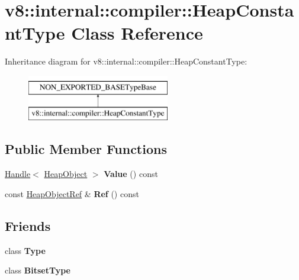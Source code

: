 \hypertarget{classv8_1_1internal_1_1compiler_1_1HeapConstantType}{}\section{v8\+:\+:internal\+:\+:compiler\+:\+:Heap\+Constant\+Type Class Reference}
\label{classv8_1_1internal_1_1compiler_1_1HeapConstantType}
Inheritance diagram for v8\+:\+:internal\+:\+:compiler\+:\+:Heap\+Constant\+Type\+:\begin{figure}[H]
\begin{center}
\leavevmode
\includegraphics[height=2.000000cm]{classv8_1_1internal_1_1compiler_1_1HeapConstantType}
\end{center}
\end{figure}
\subsection*{Public Member Functions}
\begin{DoxyCompactItemize}
\item 
\mbox{\label{classv8_1_1internal_1_1compiler_1_1HeapConstantType_ac09bcccb49115e5c814a49a6dc2c49ae}} 
\mbox{\hyperlink{classv8_1_1internal_1_1Handle}{Handle}}$<$ \mbox{\hyperlink{classv8_1_1internal_1_1HeapObject}{Heap\+Object}} $>$ {\bfseries Value} () const
\item 
\mbox{\label{classv8_1_1internal_1_1compiler_1_1HeapConstantType_a1de4543a05b2c1d165d0f3c6062e58e8}} 
const \mbox{\hyperlink{classv8_1_1internal_1_1compiler_1_1HeapObjectRef}{Heap\+Object\+Ref}} \& {\bfseries Ref} () const
\end{DoxyCompactItemize}
\subsection*{Friends}
\begin{DoxyCompactItemize}
\item 
\mbox{\label{classv8_1_1internal_1_1compiler_1_1HeapConstantType_a18dba29b4f3e91d6d2bc53472a6bb7cc}} 
class {\bfseries Type}
\item 
\mbox{\label{classv8_1_1internal_1_1compiler_1_1HeapConstantType_ae1bc4470107e0fde432ac5e20204635d}} 
class {\bfseries Bitset\+Type}
\end{DoxyCompactItemize}


